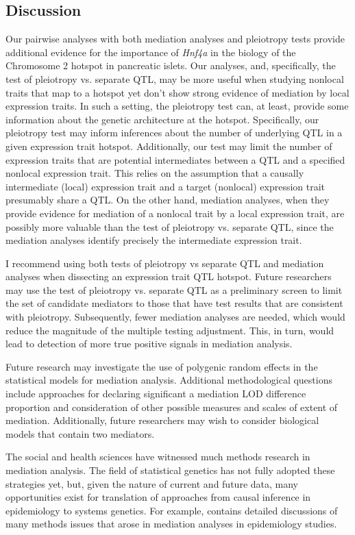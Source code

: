 \documentclass[oneside]{book}\usepackage[]{graphicx}\usepackage[]{color}
\begin{document}
\subsection{Discussion}

Our pairwise analyses with both mediation analyses and pleiotropy tests provide additional
evidence for the importance of \emph{Hnf4a} in the biology of the Chromosome 2 hotspot
in pancreatic islets. 
Our analyses, and, specifically, the test of pleiotropy vs. separate QTL, may be more useful
when studying nonlocal traits that map to a hotspot yet don't show strong evidence
of mediation by local expression traits. 
In such a setting, the pleiotropy test can, at least, provide some information about 
the genetic architecture at the hotspot. 
Specifically, our pleiotropy test may inform inferences about the number of 
underlying QTL in a given expression trait hotspot. 
Additionally, our test may limit the number of expression traits that are 
potential intermediates between a QTL and a specified nonlocal expression trait. 
This relies on the assumption that a causally intermediate (local) expression trait and a
target (nonlocal) expression trait presumably share a QTL. On the other hand, mediation analyses, when they provide evidence for mediation of a nonlocal
trait by a local expression trait, are possibly more valuable than the test of pleiotropy vs.
separate QTL, since the mediation analyses identify precisely the intermediate expression trait.

I recommend using both tests of pleiotropy vs separate QTL and mediation analyses when
dissecting an expression trait QTL hotspot. 
Future researchers may use the test of pleiotropy vs. separate QTL as a 
preliminary screen to limit the set of candidate mediators to those that have 
test results that are consistent with pleiotropy. Subsequently, fewer mediation 
analyses are needed, which would reduce the magnitude of the multiple testing 
adjustment. This, in turn, would lead to detection of more true positive signals 
in mediation analysis. 

Future research may investigate the use of polygenic random effects in the statistical models
for mediation analysis. Additional methodological questions include approaches for declaring
significant a mediation LOD difference proportion and consideration of other possible measures
and scales of extent of mediation. Additionally, future researchers may wish to consider
biological models that contain two mediators.

The social and health sciences have witnessed much methods research in mediation analysis. 
The field of statistical genetics has not fully adopted these strategies yet, but, given the
nature of current and future data, many opportunities exist for translation of approaches from
causal inference in epidemiology to systems genetics. 
For example, \citet{vanderweele2015explanation} contains detailed discussions of many methods
issues that arose in mediation analyses in
epidemiology studies.
\end{document}

